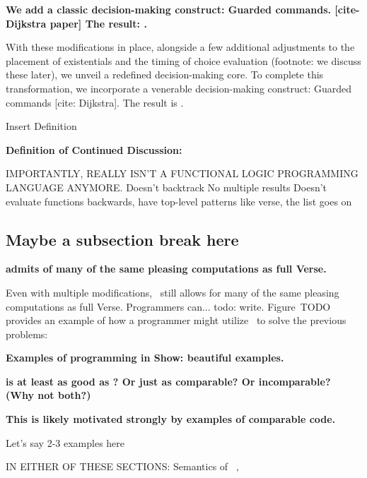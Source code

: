 \documentclass[manuscript,screen,review, 12pt]{acmart}
\begin{document}
\begin{outline}[enumerate]
         \bf{We add a classic decision-making construct: Guarded commands. } [cite- Dijkstra paper]
         \bf{The result: \VMinus. }
        
        With these modifications in place, alongside a few additional
        adjustments to the placement of existentials and the timing of choice
        evaluation (footnote: we discuss these later), we unveil a redefined decision-making core. To complete this
        transformation, we incorporate a venerable decision-making construct:
        Guarded commands [cite: Dijkstra]. The result is \VMinus. 
        
        Insert Definition

     \bf{Definition of \VMinus}
     \bf{Continued Discussion:}

     IMPORTANTLY, \VMinus REALLY ISN'T A FUNCTIONAL LOGIC PROGRAMMING LANGUAGE ANYMORE. 
     Doesn't backtrack
     No multiple results 
     Doesn't evaluate functions backwards, have top-level patterns like verse, the list goes on 



    \subsection{Maybe a subsection break here}
    
     \bf{{\VMinus} admits of many of the same pleasing computations as full Verse. }
    
    Even with multiple modifications, \VMinus\ still allows for many of the same
    pleasing computations as full Verse. Programmers can... todo: write.
    Figure~TODO provides an example of how a programmer might utilize
    \VMinus\ to solve the previous problems:

     \bf{Examples of programming in \VMinus }
     \bf{Show: beautiful examples. }
   
   
     \bf{{\VMinus} is at least as good as {\PPlus}? Or just as comparable? }
        Or incomparable? (Why not both?)



     \bf{\bf{This is likely motivated strongly by examples of comparable code.}}

     Let's say 2-3 examples here

    \end{outline}

IN EITHER OF THESE SECTIONS: Semantics of \PPlus\ , \VMinus
\end{document}
